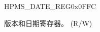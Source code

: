 \begin{register}{H}{PMS\_DATE\_REG}{0x0FFC}\label{regdesc:PMSDATEREG}
%
%
\regnewline%
\begin{regdesc}\begin{reglist}
\label{fielddesc:PMSDATE}\item [PMS\_DATE] 版本和日期寄存器。 (R/W)
\end{reglist}\end{regdesc}
\end{register}
